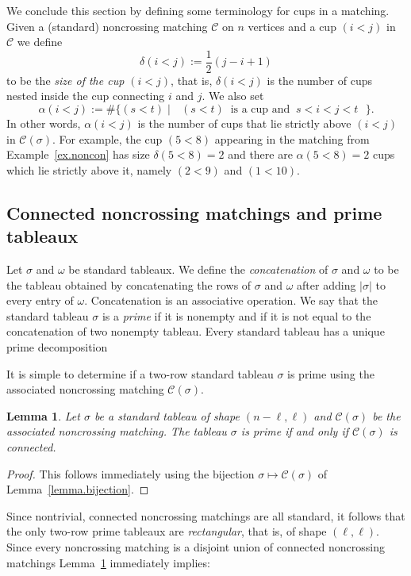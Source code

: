 \documentclass[11pt]{amsart}
\newtheorem{lemma}[theorem]{Lemma}
\theoremstyle{remark}
\theoremstyle{remark}
\theoremstyle{definition}
\theoremstyle{definition}
\theoremstyle{definition}
\numberwithin{equation}{section}
\newcommand{\ga}{\alpha}
\newcommand{\gs}{\sigma}
\newcommand{\cc}{\mathcal{C}}
\newcommand{\cupsigma}{\cc(\gs)}
\begin{document}
We conclude this section by defining some terminology for cups in a matching.  Given a (standard) noncrossing matching $\cc$ on $n$ vertices and a cup $(i<j)$ in $\cc$ we define 
\[
\delta(i<j):=\frac{1}{2}(j-i+1)
\]
to be the \emph{size of the cup $(i<j)$}, that is, $\delta(i<j)$ is the number of cups nested inside the cup connecting $i$ and $j$. We also set 
 \[
 \ga(i<j):=\#\{(s<t) \mid \text{ $(s<t) \ $  is a cup and $\ s<i<j<t$ }\}.
 \]
In other words, $\ga(i<j)$ is the number of cups that lie strictly above $(i<j)$ in $\cupsigma$.  For example, the cup $(5<8)$ appearing in the matching from Example~\ref{ex.noncon} has size $\delta(5<8)=2$ and there are $\ga(5<8)=2$ cups which lie strictly above it, namely $(2<9)$ and $(1<10)$.





\subsection{Connected noncrossing matchings and prime tableaux}
Let $\gs$ and $\omega$ be standard tableaux. We define the \emph{concatenation} of $\gs$ and $\omega$ to be the tableau obtained by concatenating the rows of $\gs$ and $\omega$ after adding $|\gs|$ to every entry of $\omega$. Concatenation is an associative operation. We say that the standard tableau $\gs$ is a \emph{prime} if it is nonempty and if it is not equal to the concatenation of two nonempty tableau. Every standard tableau has a unique prime decomposition \cite[Proposition 1.3.3.]{Tirrell2016}  

It is simple to determine if a two-row standard tableau $\gs$ is prime using the associated noncrossing matching $\cupsigma$.  

\begin{lemma}\label{lemma.primetoconn} Let $\gs$ be a standard tableau of shape $(n-\ell, \ell)$ and $\cupsigma$ be the associated noncrossing matching. The tableau $\gs$ is prime if and only if $\cupsigma$ is connected. 
\end{lemma}
\begin{proof} This follows immediately using the bijection $\gs \mapsto \cupsigma$ of Lemma~\ref{lemma.bijection}.
\end{proof}

Since nontrivial, connected noncrossing matchings are all standard, it follows that the only two-row prime tableaux are \emph{rectangular}, that is, of shape $(\ell, \ell)$.  Since every noncrossing matching is a disjoint union of connected noncrossing matchings  Lemma~\ref{lemma.primetoconn} immediately implies: 
\end{document}
